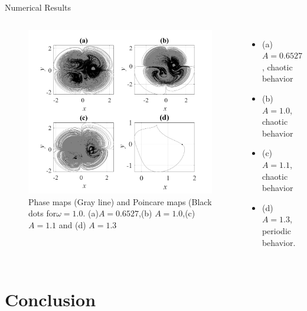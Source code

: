 \documentclass[
	10pt,aspectratio=169 %
]{beamer}
\begin{document}
\begin{frame}{Numerical Results}
   \transwipe
    \begin{columns}
        \begin{figure}
            \centering
            \includegraphics[scale=0.25]{Imagens/mapadefasenovo.png}
            \caption{ Phase maps (Gray line) and Poincare maps (Black dots for$\omega=1.0$. (a)$A=0.6527$,(b) $A=1.0$,(c) $A=1.1$ and (d) $A=1.3$}
            \label{fig:04}
        \end{figure}
        \begin{itemize}
            \item (a) $A=0.6527$, chaotic behavior
            \item (b) $A=1.0$,  chaotic behavior
            \item (c) $A=1.1$,  chaotic behavior
            \item (d) $A=1.3$,  periodic behavior.
        \end{itemize}
    \end{columns}
\end{frame}
\section{Conclusion}
\end{document}

